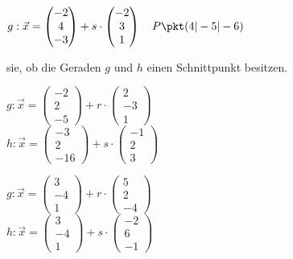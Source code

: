\documentclass[11pt, a5paper, landscape]{scrartcl}
\begin{document}
\begin{aufgabe}
\begin{multicols}{2}
\begin{enumeratea}
				\item $g:\vec{x} = \begin{pmatrix} -2 \\ 4 \\ -3 \end{pmatrix} + s\cdot \begin{pmatrix} -2 \\ 3 \\ 1 \end{pmatrix}\quad P\pkt(4|-5|-6)$
			\end{enumeratea}
			
			\vspace{2cm}
			 sie, ob die Geraden $g$ und $h$ einen Schnittpunkt besitzen.
			\begin{enumeratea}
				\item $g:\vec{x} = \begin{pmatrix} -2 \\ 2 \\ -5 \end{pmatrix} + r\cdot \begin{pmatrix} 2 \\ -3 \\ 1 \end{pmatrix}$\\ $h:\vec{x} = \begin{pmatrix} -3 \\ 2 \\ -16 \end{pmatrix} + s\cdot \begin{pmatrix} -1 \\ 2 \\ 3 \end{pmatrix}$
				
				\item $g:\vec{x} = \begin{pmatrix} 3 \\ -4 \\ 1 \end{pmatrix} + r\cdot \begin{pmatrix} 5 \\ 2 \\ -4 \end{pmatrix}$\\ $h:\vec{x} = \begin{pmatrix} 3 \\ -4 \\ 1 \end{pmatrix} + s\cdot \begin{pmatrix} -2 \\ 6 \\ -1 \end{pmatrix}$
			\end{enumeratea}
		\end{multicols}
	\end{aufgabe}
	\clearpage
	
\end{document}
